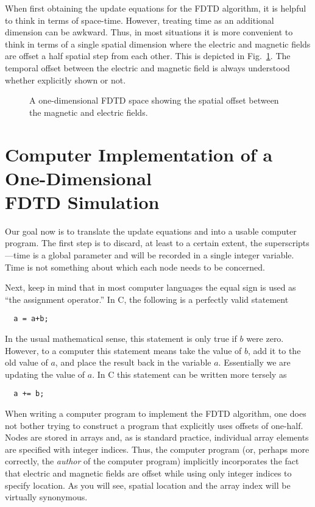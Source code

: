 When first obtaining the update equations for the FDTD algorithm, it
is helpful to think in terms of space-time.  However, treating time as
an additional dimension can be awkward.  Thus, in most situations it
is more convenient to think in terms of a single spatial dimension
where the electric and magnetic fields are offset a half spatial step
from each other.  This is depicted in Fig.\
\ref{fig:fdtdOneD}.  The temporal offset between the electric and
magnetic field is always understood whether explicitly shown or not.
\begin{figure}
  \begin{center}
  \end{center}
  \caption{A one-dimensional FDTD space showing the spatial offset
  between the magnetic and electric fields.}
  \label{fig:fdtdOneD}
\end{figure}


\section{Computer Implementation of a One-Dimensional\\ FDTD Simulation}

Our goal now is to translate the update equations 
and \refeq{eq:updateEz} into a usable computer program.  The first
step is to discard, at least to a certain extent, the
superscripts---time is a global parameter and will be recorded in a
single integer variable.  Time is not something about which each node
needs to be concerned.

Next, keep in mind that in most computer languages the equal sign is
used as ``the assignment operator.''  In C, the following is a
perfectly valid statement
\begin{verbatim}
  a = a+b;
\end{verbatim}
In the usual mathematical sense, this statement is only true if $b$
were zero.  However, to a computer this statement means take the value
of $b$, add it to the old value of $a$, and place the result back in
the variable $a$.  Essentially we are updating the value of $a$.  In C
this statement can be written more tersely as
\begin{verbatim}
  a += b;
\end{verbatim}

When writing a computer program to implement the FDTD algorithm, one
does not bother trying to construct a program that explicitly uses
offsets of one-half.  Nodes are stored in arrays and, as is standard
practice, individual array elements are specified with integer
indices.  Thus, the computer program (or, perhaps more correctly, the
{\em author} of the computer program) implicitly incorporates the fact
that electric and magnetic fields are offset while using only integer
indices to specify location.  As you will see, spatial location and
the array index will be virtually synonymous.

